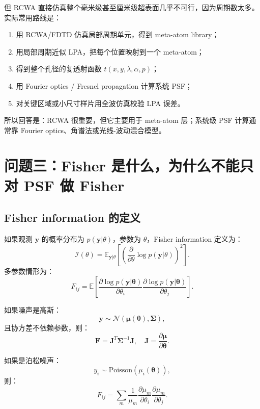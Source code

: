\documentclass[11pt,a4paper,fontset=none]{ctexart}
\begin{document}
但 RCWA 直接仿真整个毫米级甚至厘米级超表面几乎不可行，因为周期数太多。实际常用路线是：
\begin{enumerate}
  \item 用 RCWA/FDTD 仿真局部周期单元，得到 meta-atom library；
  \item 用局部周期近似 LPA，把每个位置映射到一个 meta-atom；
  \item 得到整个孔径的复透射函数 $t(x,y,\lambda,\alpha,p)$；
  \item 用 Fourier optics / Fresnel propagation 计算系统 PSF；
  \item 对关键区域或小尺寸样片用全波仿真校验 LPA 误差。
\end{enumerate}

所以回答是：RCWA 很重要，但它主要用于 meta-atom 层；系统级 PSF 计算通常靠 Fourier optics、角谱法或光线-波动混合模型。

\section{问题三：Fisher 是什么，为什么不能只对 PSF 做 Fisher}

\subsection{Fisher information 的定义}

如果观测 $\bm y$ 的概率分布为 $p(\bm y|\theta)$，参数为 $\theta$，Fisher information 定义为：
\begin{equation}
  \mathcal I(\theta)
  =
  \mathbb E_{\bm y|\theta}
  \left[
  \left(
  \frac{\partial}{\partial\theta}
  \log p(\bm y|\theta)
  \right)^2
  \right].
\end{equation}
多参数情形为：
\begin{equation}
  F_{ij}
  =
  \mathbb E
  \left[
  \frac{\partial \log p(\bm y|\bm\theta)}{\partial \theta_i}
  \frac{\partial \log p(\bm y|\bm\theta)}{\partial \theta_j}
  \right].
\end{equation}

如果噪声是高斯：
\begin{equation}
  \bm y\sim\mathcal N(\bm\mu(\bm\theta),\bm\Sigma),
\end{equation}
且协方差不依赖参数，则：
\begin{equation}
  \bm F
  =
  \bm J^T\bm\Sigma^{-1}\bm J,
  \quad
  \bm J=\frac{\partial \bm\mu}{\partial \bm\theta}.
\end{equation}

如果是泊松噪声：
\begin{equation}
  y_i\sim\mathrm{Poisson}(\mu_i(\bm\theta)),
\end{equation}
则：
\begin{equation}
  F_{ij}
  =
  \sum_m
  \frac{1}{\mu_m}
  \frac{\partial\mu_m}{\partial\theta_i}
  \frac{\partial\mu_m}{\partial\theta_j}.
\end{equation}
\end{document}
